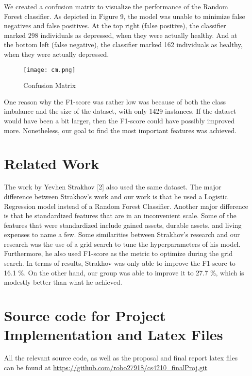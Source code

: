 \documentclass[conference]{IEEEtran}
\begin{document}
We created a confusion matrix to visualize the performance of the Random Forest classifier. As depicted in Figure 9, the model was unable to minimize false negatives and false positives. At the top right (false positive), the classifier marked 298 individuals as depressed, when they were actually healthy. And at the bottom left (false negative), the classifier marked 162 individuals as healthy, when they were actually depressed.
\begin{figure}[hbt!]
\centering
\texttt{[image: cm.png]}
\caption{Confusion Matrix\label{overflow}}
\end{figure}

One reason why the F1-score was rather low was because of both the class imbalance and the size of the dataset, with only 1429 instances. If the dataset would have been a bit larger, then the F1-score could have possibly improved more. Nonetheless, our goal to find the most important features was achieved.


\section{Related Work}
The work  by Yevhen Strakhov [2] also used the same dataset. The major difference between Strakhov's work and our work is that he used a Logistic Regression model instead of a Random Forest Classifier. Another major difference is that he standardized features that are in an inconvenient scale. Some of the features that were standardized include gained assets, durable assets, and living expenses to name a few. Some similarities between Strakhov's research and our research was the use of a grid search to tune the hyperparameters of his model. Furthermore, he also used F1-score as the metric to optimize during the grid search. In terms of results, Strakhov was only able to improve the F1-score to 16.1 \%. On the other hand, our group was able to improve it to 27.7 \%, which is modestly better than what he achieved.

\section{Source code for Project Implementation and Latex Files}
All the relevant source code, as well as the proposal and final report latex files can be found at \url {https://github.com/robo27918/cs4210_finalProj.git}
\end{document}
